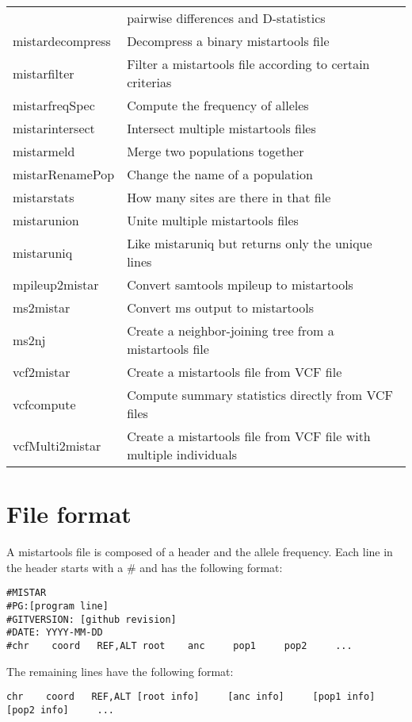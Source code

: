 \documentclass[a4paper]{article}
\begin{document}
\begin{tabular}{|l|l|}
              & pairwise differences and D-statistics \\
mistardecompress & Decompress a binary mistartools file \\
mistarfilter & Filter a mistartools file according to certain criterias \\
mistarfreqSpec & Compute the frequency of alleles \\
mistarintersect & Intersect multiple mistartools files \\
mistarmeld & Merge two populations together \\
mistarRenamePop & Change the name of a population \\
mistarstats & How many sites are there in that file \\
mistarunion & Unite multiple mistartools files \\
mistaruniq & Like mistaruniq but returns only the unique lines \\
mpileup2mistar & Convert samtools mpileup to mistartools \\
ms2mistar & Convert ms output to mistartools \\
ms2nj & Create a neighbor-joining tree from a mistartools file \\
vcf2mistar & Create a mistartools file from VCF file \\
vcfcompute & Compute summary statistics directly from VCF files \\
vcfMulti2mistar & Create a mistartools file from VCF file with multiple individuals \\
\hline
\end{tabular}

\section{File format}

\noindent  A mistartools file is composed of a header and the allele frequency. Each line in the header starts with a \# and has the following format:

\begin{verbatim}
#MISTAR
#PG:[program line]
#GITVERSION: [github revision]
#DATE: YYYY-MM-DD
#chr    coord   REF,ALT root    anc     pop1     pop2     ...
\end{verbatim}


\noindent The remaining lines have the following format:

\begin{verbatim}
chr    coord   REF,ALT [root info]     [anc info]     [pop1 info]     [pop2 info]     ...
\end{verbatim}
\end{document}
